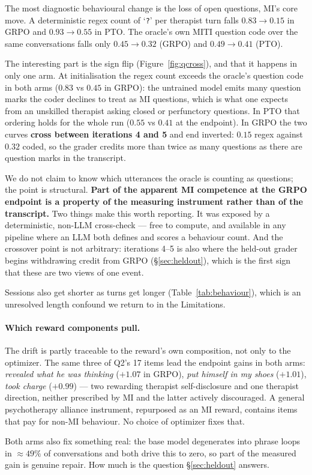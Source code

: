 The most diagnostic behavioural change is the loss of open questions, MI's core move. A
deterministic regex count of `\texttt{?}' per therapist turn falls
$0.83\rightarrow0.15$ in GRPO and $0.93\rightarrow0.55$ in PTO. The oracle's own MITI
question code over the same conversations falls only $0.45\rightarrow0.32$ (GRPO) and
$0.49\rightarrow0.41$ (PTO).

The interesting part is the sign flip (Figure~\ref{fig:qcross}), and that it happens in only
one arm. At initialisation the regex count exceeds the oracle's question code in both arms
($0.83$ vs $0.45$ in GRPO): the untrained model emits many question marks the coder declines
to treat as MI questions, which is what one expects from an unskilled therapist asking closed
or perfunctory questions. In PTO that ordering holds for the whole run ($0.55$ vs $0.41$ at
the endpoint). In GRPO the two curves \textbf{cross between iterations 4 and 5} and end
inverted: $0.15$ regex against $0.32$ coded, so the grader credits more than twice as many
questions as there are question marks in the transcript.

We do not claim to know which utterances the oracle is counting as questions; the point is
structural. \textbf{Part of the apparent MI competence at the GRPO endpoint is a property of
the measuring instrument rather than of the transcript.} Two things make this worth
reporting. It was exposed by a deterministic, non-LLM cross-check --- free to compute, and
available in any pipeline where an LLM both defines and scores a behaviour count. And the
crossover point is not arbitrary: iterations 4--5 is also where the held-out grader begins
withdrawing credit from GRPO (\S\ref{sec:heldout}), which is the first sign that these are two
views of one event.

Sessions also get shorter as turns get longer (Table~\ref{tab:behaviour}), which is an
unresolved length confound we return to in the Limitations.

\paragraph{Which reward components pull.} The drift is partly traceable to the reward's own
composition, not only to the optimizer. The same three of Q2's 17 items lead the endpoint gains
in both arms: \emph{revealed what he was thinking} ($+1.07$ in GRPO), \emph{put himself in my
shoes} ($+1.01$), \emph{took charge} ($+0.99$) --- two rewarding therapist self-disclosure and
one therapist direction, neither prescribed by MI and the latter actively discouraged. A general
psychotherapy alliance instrument, repurposed as an MI reward, contains items that pay for
non-MI behaviour. No choice of optimizer fixes that.

Both arms also fix something real: the base model degenerates into phrase loops in
${\approx}49\%$ of conversations and both drive this to zero, so part of the measured gain is
genuine repair. How much is the question \S\ref{sec:heldout} answers.
